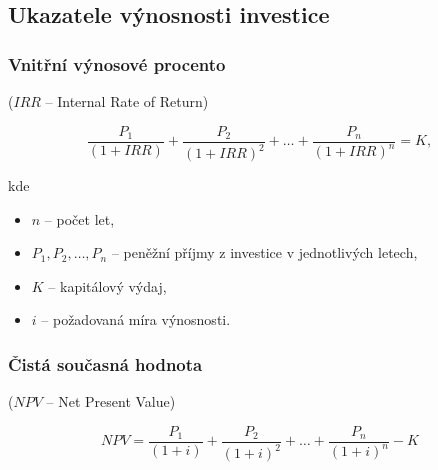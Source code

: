 \subsection{Ukazatele výnosnosti investice}



\subsubsection*{Vnitřní výnosové procento}

($IRR$ -- Internal Rate of Return)


$$ \frac{P_1}{(1+IRR)} + \frac{P_2}{(1+IRR)^2} + \ldots + \frac{P_n}{(1+IRR)^n} = K , $$

kde
\begin{itemize}[label={}]
    \item $n$ -- počet let,
    \item $P_1, P_2, \ldots, P_n$ -- peněžní příjmy z investice v jednotlivých letech,
    \item $K$ -- kapitálový výdaj,
    \item $i$ -- požadovaná míra výnosnosti.
\end{itemize}

\subsubsection*{Čistá současná hodnota}

($NPV$ -- Net Present Value)

$$ NPV = \frac{P_1}{(1+i)} + \frac{P_2}{(1+i)^2} + \ldots + \frac{P_n}{(1+i)^n} - K $$